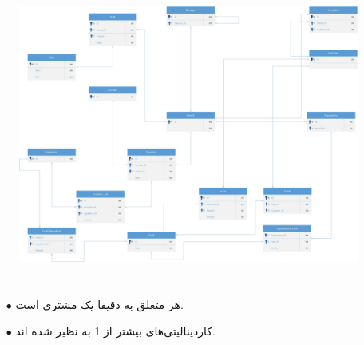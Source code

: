 \documentclass{article}
\begin{document}
\subsection{}
\begin{figure}[H]
    \centering
    \includegraphics[width=1\textwidth]{figures/D2.jpg}
    \caption
	{
	}
    \label{fig:fig1}
\end{figure}

\section{}
\begin{itemize}
    \item [$\bullet$] هر  متعلق به دقیقا یک مشتری است.
    \item [$\bullet$] کاردینالیتی‌های بیشتر از 1 به  نظیر شده اند.
\end{itemize}
\end{document}
